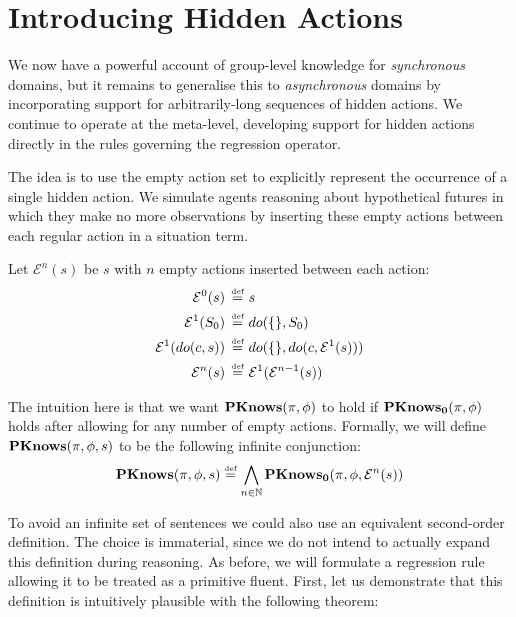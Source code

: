 \section{Introducing Hidden Actions\label{sec:CKnowledge:Asynchronous}}

We now have a powerful account of group-level knowledge for \emph{synchronous}
domains, but it remains to generalise this to \emph{asynchronous}
domains by incorporating support for arbitrarily-long sequences of
hidden actions. We continue to operate at the meta-level, developing
support for hidden actions directly in the rules governing the regression
operator.

The idea is to use the empty action set to explicitly represent the
occurrence of a single hidden action. We simulate agents reasoning
about hypothetical futures in which they make no more observations
by inserting these empty actions between each regular action in a
situation term.

\begin{defn}
Let $\mathcal{E}^{n}(s)$ be $s$ with $n$ empty actions inserted
between each action:\begin{align*}
\mathcal{E}^{0}(s)\,\stackrel{\mbox{\tiny def}}{=}\,\, & s\\
\mathcal{E}^{1}(S_{0})\,\stackrel{\mbox{\tiny def}}{=}\,\, & do(\{\},S_{0})\\
\mathcal{E}^{1}(do(c,s))\,\stackrel{\mbox{\tiny def}}{=}\,\, & do(\{\},do(c,\mathcal{E}^{1}(s)))\\
\mathcal{E}^{n}(s)\,\stackrel{\mbox{\tiny def}}{=}\,\, & \mathcal{E}^{1}(\mathcal{E}^{n-1}(s))\end{align*}

\end{defn}
The intuition here is that we want $\mathbf{PKnows}(\pi,\phi)$ to hold if
$\mathbf{PKnows_{0}}(\pi,\phi)$ holds after allowing for any number of empty
actions. Formally, we will define $\mathbf{PKnows}(\pi,\phi,s)$ to be the
following infinite conjunction:\[
\mathbf{PKnows}(\pi,\phi,s)\stackrel{\mbox{\tiny def}}{=}\bigwedge_{n\in\mathbb{N}}\mathbf{PKnows_{0}}(\pi,\phi,\mathcal{E}^{n}(s))\]


To avoid an infinite set of sentences we could also use an equivalent
second-order definition. The choice is immaterial, since we do not
intend to actually expand this definition during reasoning. As before,
we will formulate a regression rule allowing it to be treated as a
primitive fluent. First, let us demonstrate that this definition is
intuitively plausible with the following theorem:

